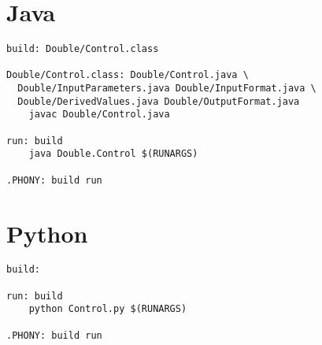 \section{Java}\label{a:dm:java}
\begin{tcolorbox}[breakable, toprule at break=0pt, bottomrule at break=0pt]
\begin{verbatim}
build: Double/Control.class

Double/Control.class: Double/Control.java \
  Double/InputParameters.java Double/InputFormat.java \
  Double/DerivedValues.java Double/OutputFormat.java
	javac Double/Control.java

run: build
	java Double.Control $(RUNARGS)

.PHONY: build run

\end{verbatim}
\end{tcolorbox}

\section{Python}\label{a:dm:python}
\begin{tcolorbox}[breakable, toprule at break=0pt, bottomrule at break=0pt]
\begin{verbatim}
build:

run: build
	python Control.py $(RUNARGS)

.PHONY: build run

\end{verbatim}
\end{tcolorbox}
